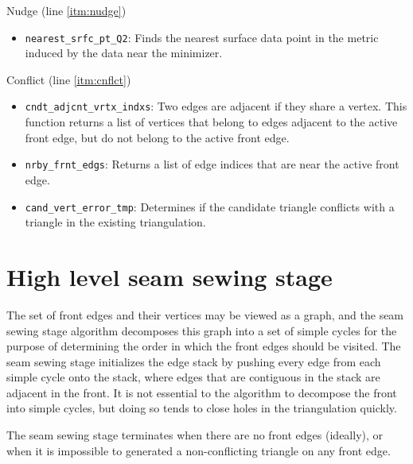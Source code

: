 \documentclass[11pt]{amsart}
\begin{document}
\noindent
Nudge (line \ref{itm:nudge})
\begin{itemize}
\item
\verb+nearest_srfc_pt_Q2+: Finds the nearest surface data point in the metric induced by the data near the minimizer.
\end{itemize}

\noindent
Conflict (line \ref{itm:cnflct})
\begin{itemize}
\item
\verb+cndt_adjcnt_vrtx_indxs+: Two edges are adjacent if they share a vertex.
This function returns a list of vertices that belong to edges adjacent to the active front edge, but do not belong to the active front edge.
\item
\verb+nrby_frnt_edgs+: Returns a list of edge indices that are near the active front edge.
\item
\verb+cand_vert_error_tmp+: Determines if the candidate triangle conflicts with a triangle in the existing triangulation.
\end{itemize}

\section{High level seam sewing stage}
The set of front edges and their vertices may be viewed as a graph, and the seam sewing stage algorithm decomposes this graph into a set of simple cycles for the purpose of determining the order in which the front edges should be visited.
The seam sewing stage initializes the edge stack by pushing every edge from each simple cycle onto the stack, where edges that are contiguous in the stack are adjacent in the front.
It is not essential to the algorithm to decompose the front into simple cycles, but doing so tends to close holes in the triangulation quickly.

The seam sewing stage terminates when there are no front edges (ideally), or when it is impossible to generated a non-conflicting triangle on any front edge.

%
%
%
%
\end{document}
